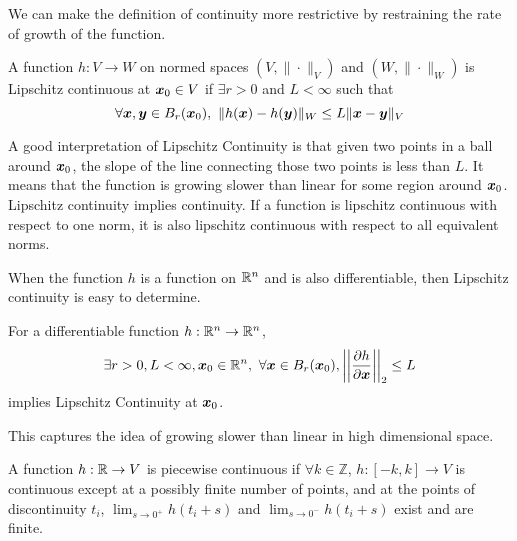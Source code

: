 We can make the definition of continuity more restrictive by restraining the
rate of growth of the function.
\begin{definition}
	A function $h:V\to W$ on normed spaces $(V, \|\cdot\|_V)$ and $(W,
	\|\cdot\|_W)$ is Lipschitz continuous at $\boldsymbol{x}_0\in V$ if $\exists r > 0$
	and $L < \infty$ such that \[
		\forall \boldsymbol{x}, \boldsymbol{y}\in B_r(\boldsymbol{x}_0),\ \|h(\boldsymbol{x}) - h(\boldsymbol{y})\|_W \leq L
		\|\boldsymbol{x} - \boldsymbol{y}\|_V
	\]
	\label{defn:lipschitz-continuity}
\end{definition}
A good interpretation of Lipschitz Continuity is that given two points in a ball
around $\boldsymbol{x}_0$, the slope of the line connecting those two points is less
than $L$. It means that the function is growing slower than linear for some
region around $\boldsymbol{x}_0$. Lipschitz continuity implies continuity. If a function
is lipschitz continuous with respect to one norm, it is also lipschitz
continuous with respect to all equivalent norms.

When the function $h$ is a function on $\mathbb{R}^n$ and is also
differentiable, then Lipschitz continuity is easy to determine.
\begin{theorem}
	For a differentiable function $h:\mathbb{R}^n\to\mathbb{R}^n$, \[
		\exists r>0, L < \infty, \bs{x}_0\in\R^n,\ \forall \bs{x}\in B_r(\bs{x}_0),
		\left\lvert\left\lvert\frac{\partial h}{\partial
		\bs{x}}\right\rvert\right\rvert_2 \leq L
	\] implies Lipschitz Continuity at $\boldsymbol{x}_0$.
	\label{thm:differentiable-lipschitz}
\end{theorem}
This captures the idea of growing slower than linear in high dimensional space.
\begin{definition}
	A function $h:\mathbb{R}\to V$ is piecewise continuous if $\forall k\in \mathbb{Z}$,
	$h:[-k, k] \to V$ is continuous except at a possibly finite number of points,
	and at the points of discontinuity $t_i$, $\lim_{s\to0^+} h(t_i+s)$ and
	$\lim_{s\to0^-}h(t_i+s)$ exist and are finite. 
	\label{defn:piecewise-continuous}
\end{definition}
